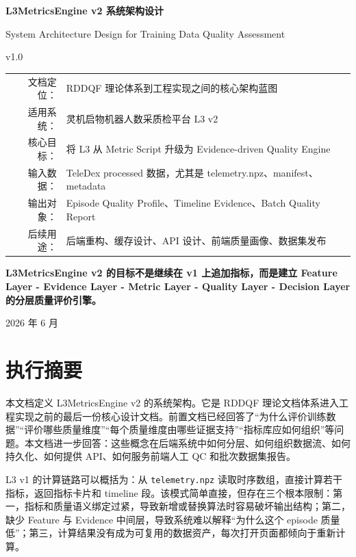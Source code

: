 \documentclass[UTF8,zihao=-4]{ctexart}
\newcommand{\Code}[1]{\texttt{#1}}
\begin{document}
\begin{titlepage}
\centering
\vspace*{2.2cm}
{\Huge\bfseries L3MetricsEngine v2 系统架构设计\par}
\vspace{0.35cm}
{\Large System Architecture Design for Training Data Quality Assessment\par}
\vspace{0.65cm}
{\LARGE v1.0\par}
\vspace{1.2cm}
\begin{tabular}{rl}
文档定位： & RDDQF 理论体系到工程实现之间的核心架构蓝图 \\
适用系统： & 灵机启物机器人数采质检平台 L3 v2 \\
核心目标： & 将 L3 从 Metric Script 升级为 Evidence-driven Quality Engine \\
输入数据： & TeleDex processed 数据，尤其是 telemetry.npz、manifest、metadata \\
输出对象： & Episode Quality Profile、Timeline Evidence、Batch Quality Report \\
后续用途： & 后端重构、缓存设计、API 设计、前端质量画像、数据集发布 \\
\end{tabular}
\vfill
\begin{minipage}{0.88\linewidth}
\centering\large\bfseries
L3MetricsEngine v2 的目标不是继续在 v1 上追加指标，而是建立 Feature Layer - Evidence Layer - Metric Layer - Quality Layer - Decision Layer 的分层质量评价引擎。
\end{minipage}
\vfill
{\large 2026 年 6 月\par}
\end{titlepage}

\tableofcontents
\newpage

\section*{执行摘要}

本文档定义 L3MetricsEngine v2 的系统架构。它是 RDDQF 理论文档体系进入工程实现之前的最后一份核心设计文档。前置文档已经回答了“为什么评价训练数据”“评价哪些质量维度”“每个质量维度由哪些证据支持”“指标库应如何组织”等问题。本文档进一步回答：这些概念在后端系统中如何分层、如何组织数据流、如何持久化、如何提供 API、如何服务前端人工 QC 和批次数据集报告。

L3 v1 的计算链路可以概括为：从 \Code{telemetry.npz} 读取时序数组，直接计算若干指标，返回指标卡片和 timeline 段。该模式简单直接，但存在三个根本限制：第一，指标和质量语义绑定过紧，导致新增或替换算法时容易破坏输出结构；第二，缺少 Feature 与 Evidence 中间层，导致系统难以解释“为什么这个 episode 质量低”；第三，计算结果没有成为可复用的数据资产，每次打开页面都倾向于重新计算。
\end{document}
